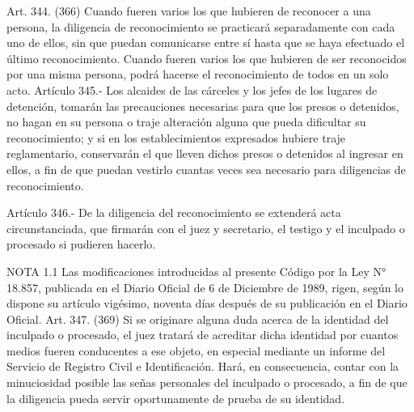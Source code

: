     Art. 344. (366) Cuando fueren varios los que hubieren de reconocer a una persona, la diligencia de reconocimiento se practicará separadamente con cada uno de ellos, sin que puedan comunicarse entre sí hasta que se haya efectuado el último reconocimiento.
    Cuando fueren varios los que hubieren de ser reconocidos por una misma persona, podrá hacerse el reconocimiento de todos en un solo acto.
    Artículo 345.- Los alcaides de las cárceles y los jefes de los lugares de detención, tomarán las precauciones necesarias para que los presos o detenidos, no hagan en su persona o traje alteración alguna que pueda dificultar su reconocimiento; y si en los establecimientos expresados hubiere traje reglamentario, conservarán el que lleven dichos presos o detenidos al ingresar en ellos, a fin de que puedan vestirlo cuantas veces sea necesario para diligencias de reconocimiento.

    Artículo 346.- De la diligencia del reconocimiento se extenderá acta circunstanciada, que firmarán con el juez y secretario, el testigo y el inculpado o procesado si pudieren hacerlo.
     
     
   
 


     
     




NOTA 1.1
    Las modificaciones introducidas al presente Código por la Ley N° 18.857, publicada en el Diario Oficial de 6 de Diciembre de 1989, rigen, según lo dispone su artículo vigésimo, noventa días después de su publicación en el Diario Oficial.
    Art. 347. (369) Si se originare alguna duda acerca de la identidad del inculpado o procesado, el juez tratará de acreditar dicha identidad por cuantos medios fueren conducentes a ese objeto, en especial mediante un informe del Servicio de Registro Civil e Identificación.
    Hará, en consecuencia, contar con la minuciosidad posible las señas personales del inculpado o procesado, a fin de que la diligencia pueda servir oportunamente de prueba de su identidad.





